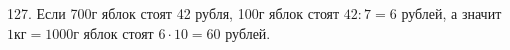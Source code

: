 127. Если 700г яблок стоят 42 рубля, 100г яблок стоят $42:7=6$ рублей, а значит $1\text{кг}=1000$г яблок стоят $6\cdot10=60$ рублей.\\
